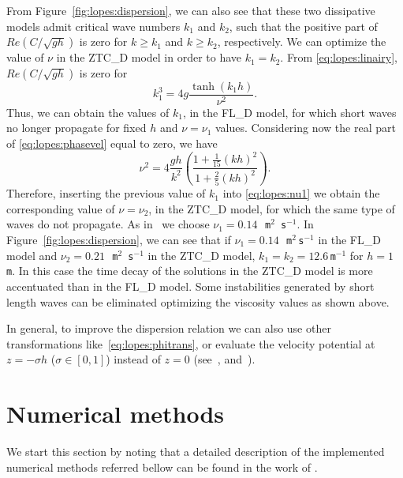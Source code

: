From Figure~\ref{fig:lopes:dispersion}, we can also see that
these two dissipative models admit critical wave numbers $k_1$ and
$k_2$, such that the positive part of $\displaystyle
Re\left(C/\sqrt{gh}\right)$ is zero for $k\geqslant k_1$ and
$k\geqslant k_2$, respectively.  We can optimize the value of $\nu$ in
the ZTC\_D model in order to have $k_1=k_2$.  From
\eqref{eq:lopes:linairy}, $\displaystyle Re\left(C/\sqrt{gh}\right)$
is zero for
\begin{equation}
  k_1^3=4g\frac{\tanh{(k_1h)}}{\nu^2}.
\end{equation}
Thus, we can obtain the values of $k_1$, in the FL\_D model, for which
short waves no longer propagate for fixed $h$ and $\nu=\nu_1$ values.
Considering now the real part of \eqref{eq:lopes:phasevel} equal to
zero, we have
\begin{equation}
\label{eq:lopes:nu1}
\nu^2=4\frac{gh}{k^2}\left(\frac{1+\frac{1}{15}(kh)^2}{1 +
    \frac{2}{5}(kh)^2}\right).
\end{equation}
Therefore, inserting the previous value of $k_1$ into
\eqref{eq:lopes:nu1} we obtain the corresponding value of $\nu=\nu_2$,
in the ZTC\_D model, for which the same type of waves do not
propagate.  As in~\citet{DutykhDias2007} we choose $\nu_1=0.14$\,{\tt
m$^2$\,s$^{-1}$}.  In Figure~\ref{fig:lopes:dispersion}, we can see
that if $\nu_1=0.14\,$~{\tt m$^2\,$s$^{-1}$}\vadjust{\pagebreak} in the FL\_D model and
$\nu_2=0.21\,$~{\tt m$^2$\,s$^{-1}$} in the ZTC\_D model,
$k_1=k_2=12.6$\,{\tt m$^{-1}$} for $h=1$\,{\tt m}.  In this case the
time decay of the solutions in the ZTC\_D model is more accentuated
than in the FL\_D model.  Some instabilities generated by short length
waves can be eliminated optimizing the viscosity values as shown
above.

In general, to improve the dispersion relation we can also use other
transformations like~\eqref{eq:lopes:phitrans}, or evaluate the
velocity potential at $z=-\sigma h$ ($\sigma\in[0,1]$) instead of
$z=0$ (see~\citet{BinghamMadsenFuhrman2008}, \citet{MadsenAgnon2003}
and~\citet{MadsenBinghamSchaffer2003}).

\enlargethispage{10pt}

\section{Numerical methods}
\label{sec:lopes:numericalmethods}
We start this section by noting that a detailed description of the
implemented numerical methods referred bellow can be found in the work
of \citet{Lopes2007}.

